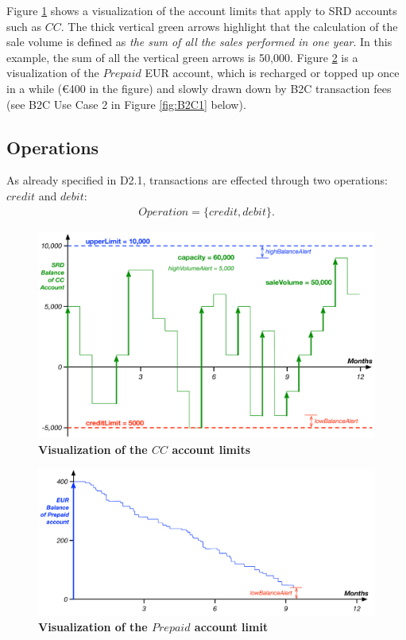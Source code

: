 Figure \ref{fig:accountLimitsCC} shows a visualization of the account limits that apply to SRD accounts such as $CC$. The thick vertical green arrows highlight that the calculation of the sale volume is defined as \emph{the sum of all the sales performed in one year}. In this example, the sum of all the vertical green arrows is 50,000. Figure \ref{fig:accountLimitsPrepaid} is a visualization of the $Prepaid$ EUR account, which is recharged or topped up once in a while (\euro 400 in the figure) and slowly drawn down by B2C transaction fees (see B2C Use Case 2 in Figure \ref{fig:B2C1} below).

\subsection{Operations}
As already specified in D2.1, transactions are effected through two operations: $credit$ and $debit$:
\begin{align}
Operation = \{ credit, debit \}.
\end{align}

\begin{figure}[h]
\vspace{-0.5cm}
\centering
\includegraphics[width=15cm]{Figures/Account_Limits_CC}
\caption{\small\textbf{Visualization of the $CC$ account limits}}
\label{fig:accountLimitsCC}
\vspace{-0.8cm}
\end{figure}


\begin{figure}[htbp]
\vspace{-0.8cm}
\centering
\includegraphics[width=15.6cm]{Figures/Account_Limits_Prepaid}
\caption{\small\textbf{Visualization of the $Prepaid$ account limit}}
\label{fig:accountLimitsPrepaid}
\vspace{-0.5cm}
\end{figure}



